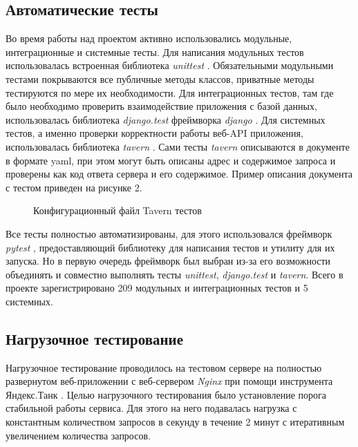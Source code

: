     \subsection{Автоматические тесты}
    Во время работы над проектом активно использовались модульные,
    интеграционные и системные тесты. \cite{test.kulikov}
    Для написания модульных тестов использовалась
    встроенная библиотека \textit{unittest} \cite{test.unittest}.
    Обязательными модульными тестами покрываются все публичные методы классов,
    приватные методы тестируются по мере их необходимости.
    Для интеграционных тестов,
    там где было необходимо проверить взаимодействие приложения с базой данных,
    использовалась библиотека \textit{django.test} фреймворка \textit{django}
    \cite{docs.django}.
    Для системных тестов, а именно проверки корректности работы веб-API
    приложения, использовалась библиотека \textit{tavern} \cite{test.tavern}.
    Сами тесты \textit{tavern} описываются в документе в формате yaml, при этом
    могут быть описаны адрес и содержимое запроса и
    проверены как код ответа сервера и его содержимое.
    Пример описания документа с тестом приведен на рисунке 2.
    \begin{figure}[H]
        \centering
        
        \caption{Конфигурационный файл Tavern тестов}
        \label{fig:tavern-tests}
    \end{figure}

    Все тесты полностью автоматизированы, для этого использовался
    фреймворк \textit{pytest} \cite{test.pytest},
    предоставляющий библиотеку для написания тестов и
    утилиту для их запуска. Но в первую очередь фреймворк был выбран из-за его
    возможности объединять и совместно выполнять тесты
    \textit{unittest}, \textit{django.test} и \textit{tavern}.
    Всего в проекте зарегистрировано 209 модульных и интеграционных тестов и
    5 системных.

    \subsection{Нагрузочное тестирование}
    Нагрузочное тестирование проводилось на тестовом сервере на полностью
    развернутом веб-приложении с веб-сервером \textit{Nginx} при помощи
    инструмента Яндекс.Танк \cite{test.yandex.tank}.
    Целью нагрузочного тестирования было установление
    порога стабильной работы сервиса. Для этого на него подавалась нагрузка
    с константным количеством запросов в секунду в течение 2 минут с итеративным
    увеличением количества запросов.

